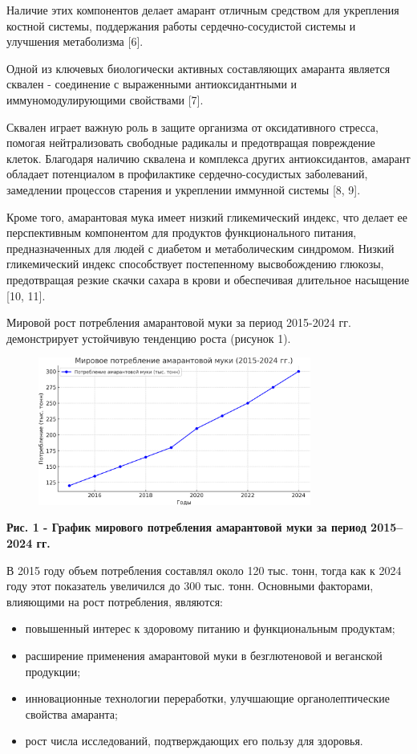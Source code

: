 {Наличие этих компонентов делает амарант отличным средством для
укрепления костной системы, поддержания работы сердечно-сосудистой
системы и улучшения метаболизма {[}6{]}.

Одной из ключевых биологически активных составляющих амаранта является
сквален - соединение с выраженными антиоксидантными и
иммуномодулирующими свойствами {[}7{]}.

Сквален играет важную роль в защите организма от оксидативного стресса,
помогая нейтрализовать свободные радикалы и предотвращая повреждение
клеток. Благодаря наличию сквалена и комплекса других антиоксидантов,
амарант обладает потенциалом в профилактике сердечно-сосудистых
заболеваний, замедлении процессов старения и укреплении иммунной системы
{[}8, 9{]}.

Кроме того, амарантовая мука имеет низкий гликемический индекс, что
делает ее перспективным компонентом для продуктов функционального
питания, предназначенных для людей с диабетом и метаболическим
синдромом. Низкий гликемический индекс способствует постепенному
высвобождению глюкозы, предотвращая резкие скачки сахара в крови и
обеспечивая длительное насыщение {[}10, 11{]}.

Мировой рост потребления амарантовой муки за период 2015-2024 гг.
демонстрирует устойчивую тенденцию роста (рисунок 1).

\begin{figure}[H]
	\centering
	\includegraphics[width=0.8\textwidth]{media/pish2/image20}
	\caption*{}
\end{figure}


{\bfseries Рис. 1 - График мирового потребления амарантовой муки за период
2015--2024 гг.}

В 2015 году объем потребления составлял около 120 тыс. тонн, тогда как к
2024 году этот показатель увеличился до 300 тыс. тонн. Основными
факторами, влияющими на рост потребления, являются:

\begin{itemize}
\item
  повышенный интерес к здоровому питанию и функциональным продуктам;
\item
  расширение применения амарантовой муки в безглютеновой и веганской
  продукции;
\item
  инновационные технологии переработки, улучшающие органолептические
  свойства амаранта;
\item
  рост числа исследований, подтверждающих его пользу для здоровья.
\end{itemize}

}
